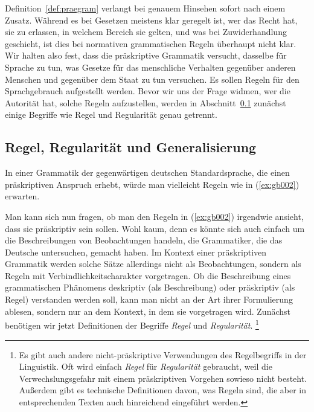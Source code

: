 Definition~\ref{def:praegram} verlangt bei genauem Hinsehen sofort nach einem Zusatz.
Während es bei Gesetzen meistens klar geregelt ist, wer das Recht hat, sie zu erlassen, in welchem Bereich sie gelten, und was bei Zuwiderhandlung geschieht, ist dies bei normativen grammatischen Regeln überhaupt nicht klar.
Wir halten also fest, dass die präskriptive Grammatik versucht, dasselbe für Sprache zu tun, was Gesetze für das menschliche Verhalten gegenüber anderen Menschen und gegenüber dem Staat zu tun versuchen.
Es sollen Regeln für den Sprachgebrauch aufgestellt werden.
Bevor wir uns der Frage widmen, wer die Autorität hat, solche Regeln aufzustellen, werden in Abschnitt~\ref{sec:regulgen} zunächst einige Begriffe wie Regel und Regularität genau getrennt.

\subsection{Regel, Regularität und Generalisierung}
\label{sec:regulgen}

In einer Grammatik der gegenwärtigen deutschen Standardsprache, die einen präskriptiven Anspruch erhebt, würde man vielleicht Regeln wie in (\ref{ex:gb002}) erwarten.

\begin{exe}
  \ex\label{ex:gb002}
  \begin{xlist}
  \end{xlist}
\end{exe}

Man kann sich nun fragen, ob man den Regeln in (\ref{ex:gb002}) irgendwie ansieht, dass sie präskriptiv sein sollen.
Wohl kaum, denn es könnte sich auch einfach um die Beschreibungen von Beobachtungen handeln, die Grammatiker, die das Deutsche untersuchen, gemacht haben.
Im Kontext einer präskriptiven Grammatik werden solche Sätze allerdings nicht als Beobachtungen, sondern als Regeln mit Verbindlichkeitscharakter vorgetragen.
Ob die Beschreibung eines grammatischen Phänomens deskriptiv (als Beschreibung) oder präskriptiv (als Regel) verstanden werden soll, kann man nicht an der Art ihrer Formulierung ablesen, sondern nur an dem Kontext, in dem sie vorgetragen wird.
Zunächst benötigen wir jetzt Definitionen der Begriffe \textit{Regel} und \textit{Regularität}.%
\footnote{Es gibt auch andere nicht-präskriptive Verwendungen des Regelbegriffs in der Linguistik.
Oft wird einfach \textit{Regel} für \textit{Regularität} gebraucht, weil die Verwechslungsgefahr mit einem präskriptiven Vorgehen sowieso nicht besteht.
Außerdem gibt es technische Definitionen davon, was Regeln sind, die aber in entsprechenden Texten auch hinreichend eingeführt werden.}



